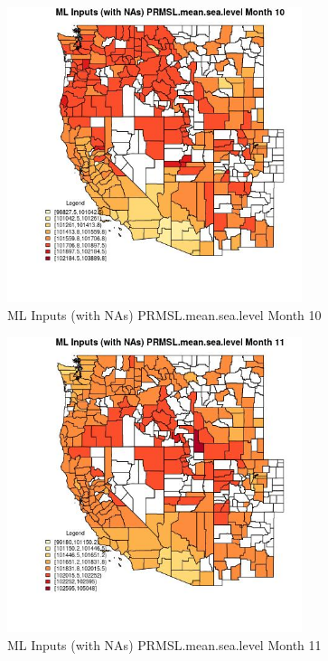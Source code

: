 \begin{figure} 
\centering  
\includegraphics[width=0.77\textwidth]{Code_Outputs/Report_ML_input_PM25_Step4_part_f_de_duplicated_aves_prioritize_24hr_obswNAs_CountyPRMSLmeansealevelmedianMonth10.jpg} 
\caption{\label{fig:Report_ML_input_PM25_Step4_part_f_de_duplicated_aves_prioritize_24hr_obswNAsCountyPRMSLmeansealevelmedianMonth10}ML Inputs (with NAs) PRMSL.mean.sea.level Month 10} 
\end{figure} 
 

\begin{figure} 
\centering  
\includegraphics[width=0.77\textwidth]{Code_Outputs/Report_ML_input_PM25_Step4_part_f_de_duplicated_aves_prioritize_24hr_obswNAs_CountyPRMSLmeansealevelmedianMonth11.jpg} 
\caption{\label{fig:Report_ML_input_PM25_Step4_part_f_de_duplicated_aves_prioritize_24hr_obswNAsCountyPRMSLmeansealevelmedianMonth11}ML Inputs (with NAs) PRMSL.mean.sea.level Month 11} 
\end{figure} 
 


